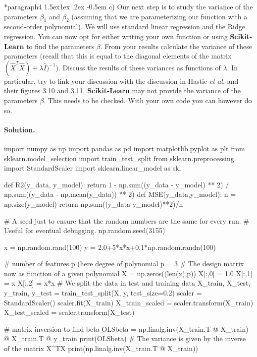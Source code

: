 \documentclass[%
oneside,                 %
final,                   %
10pt]{article}
\makeatletter
\newenvironment{doconceexercise}{}{}
\newcommand\subex{\@startsection*{paragraph}{4}{\z@}%
                  {1.5ex\@plus1ex \@minus.2ex}%
                  {-0.5em}%
                  {\normalfont\normalsize\bfseries}}
\makeatother
\begin{document}
\begin{doconceexercise}

\subex{c)}
Our next step is to study the variance of the parameters $\beta_1$ and $\beta_2$ (assuming that we are parameterizing our function with a second-order polynomial). We will use standard linear regression and the Ridge regression.  You can now opt for either writing your own function or using \textbf{Scikit-Learn} to find the parameters $\beta$. From your results calculate the variance of these parameters (recall that this is equal to the diagonal elements of the matrix $(\hat{X}^T\hat{X})+\lambda\hat{I})^{-1}$). Discuss the results of these variances as functions of $\lambda$. In particular, try to link your discussion with the discussion in Hastie \emph{et al.} and their figures 3.10 and  3.11. \textbf{Scikit-Learn} may not provide the variance of the parameters $\beta$. This needs to be checked. With your own code you can however do so.


\paragraph{Solution.}
\begin{print}
import numpy as np
import pandas as pd
import matplotlib.pyplot as plt
from sklearn.model_selection import train_test_split
from sklearn.preprocessing import StandardScaler
import sklearn.linear_model as skl

def R2(y_data, y_model):
    return 1 - np.sum((y_data - y_model) ** 2) / np.sum((y_data - np.mean(y_data)) ** 2)
def MSE(y_data,y_model):
    n = np.size(y_model)
    return np.sum((y_data-y_model)**2)/n


# A seed just to ensure that the random numbers are the same for every run.
# Useful for eventual debugging.
np.random.seed(3155)

x = np.random.rand(100)
y = 2.0+5*x*x+0.1*np.random.randn(100)

# number of features p (here degree of polynomial
p = 3
#  The design matrix now as function of a given polynomial
X = np.zeros((len(x),p))
X[:,0] = 1.0
X[:,1] = x
X[:,2] = x*x
# We split the data in test and training data
X_train, X_test, y_train, y_test = train_test_split(X, y, test_size=0.2)
scaler = StandardScaler()
scaler.fit(X_train)
X_train_scaled = scaler.transform(X_train)
X_test_scaled = scaler.transform(X_test)

# matrix inversion to find beta
OLSbeta = np.linalg.inv(X_train.T @ X_train) @ X_train.T @ y_train
print(OLSbeta)
# The variance is given by the inverse of the matrix X^TX
print(np.linalg.inv(X_train.T @ X_train))


\end{print}
\end{doconceexercise}
\end{document}
